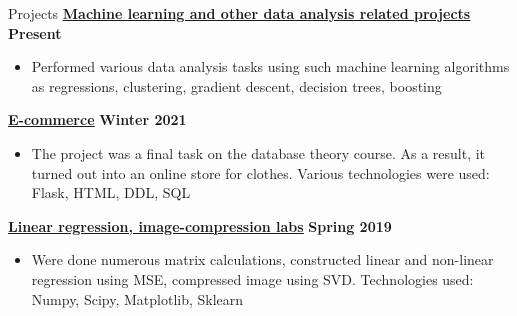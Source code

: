 \documentclass{resume} %
\begin{document}
\begin{rSection}{Projects}
{\bf \href{https://github.com/MazeBraker/HSE_study/tree/master/3_year}{\underline{Machine learning and other data analysis related projects}}} \hfill {\bf Present}
\begin{itemize}
\item Performed various data analysis tasks using such machine learning algorithms as regressions, clustering, gradient descent, decision trees, boosting
\end{itemize}
{\bf \href{https://github.com/MazeBraker/HSE_study/tree/master/3_year/Theory_of_databases}{\underline {E-commerce}}} \hfill {\bf Winter 2021} 
\begin{itemize}
\item The project was a final task on the database theory course. As a result, it turned out into an online store for clothes. Various technologies were used: Flask, HTML, DDL, SQL
\end{itemize}
{\bf \href{https://github.com/MazeBraker/HSE_study/tree/master/1_year/Linear_algebra}{\underline {Linear regression, image-compression labs}}} \hfill {\bf Spring 2019} 
\begin{itemize}
\item Were done numerous matrix calculations, constructed linear and non-linear regression using MSE, compressed image using SVD. Technologies used: Numpy, Scipy, Matplotlib, Sklearn
\end{itemize}
\end{rSection}



\end{document}
